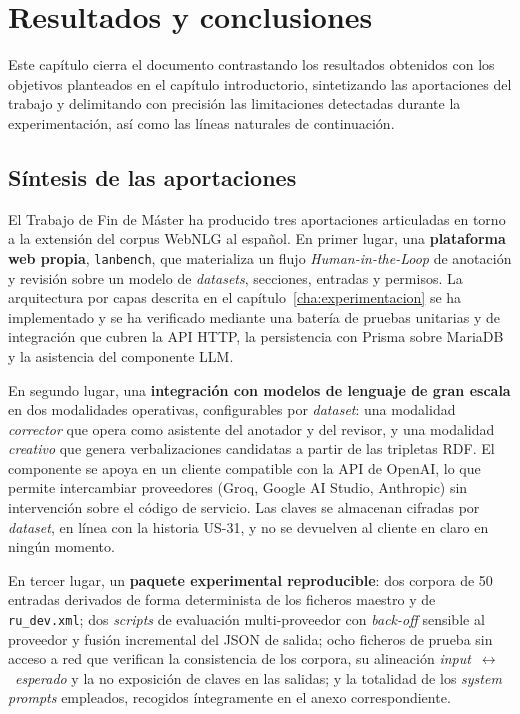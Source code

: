 
\chapter{Resultados y conclusiones}
\label{cha:resultados-conclusiones}

Este capítulo cierra el documento contrastando los resultados obtenidos con los
objetivos planteados en el capítulo introductorio, sintetizando las
aportaciones del trabajo y delimitando con precisión las limitaciones
detectadas durante la experimentación, así como las líneas naturales de
continuación.

\section{Síntesis de las aportaciones}

El Trabajo de Fin de Máster ha producido tres aportaciones articuladas en torno
a la extensión del corpus WebNLG al español. En primer lugar, una
\textbf{plataforma web propia}, \texttt{lanbench}, que materializa un flujo
\textit{Human-in-the-Loop} de anotación y revisión sobre un modelo de
\textit{datasets}, secciones, entradas y permisos. La arquitectura por capas
descrita en el capítulo~\ref{cha:experimentacion} se ha implementado y se ha
verificado mediante una batería de pruebas unitarias y de integración que
cubren la API HTTP, la persistencia con Prisma sobre MariaDB y la asistencia
del componente LLM.

En segundo lugar, una \textbf{integración con modelos de lenguaje de gran
	escala} en dos modalidades operativas, configurables por \textit{dataset}: una
modalidad \textit{corrector} que opera como asistente del anotador y del
revisor, y una modalidad \textit{creativo} que genera verbalizaciones
candidatas a partir de las tripletas RDF. El componente se apoya en un cliente
compatible con la API de OpenAI, lo que permite intercambiar proveedores (Groq,
Google AI Studio, Anthropic) sin intervención sobre el código de servicio. Las
claves se almacenan cifradas por \textit{dataset}, en línea con la historia
US-31, y no se devuelven al cliente en claro en ningún momento.

En tercer lugar, un \textbf{paquete experimental reproducible}: dos corpora de
50 entradas derivados de forma determinista de los ficheros maestro y de
\texttt{ru\_dev.xml}; dos \textit{scripts} de evaluación multi-proveedor con
\textit{back-off} sensible al proveedor y fusión incremental del JSON de
salida; ocho ficheros de prueba sin acceso a red que verifican la consistencia
de los corpora, su alineación
\textit{input}~$\leftrightarrow$~\textit{esperado} y la no exposición de claves
en las salidas; y la totalidad de los \textit{system prompts} empleados,
recogidos íntegramente en el anexo correspondiente.

